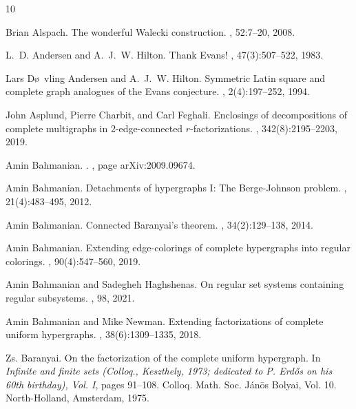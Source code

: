 \documentclass[12pt,oneside]{amsart}
\begin{document}
\begin{itemize}
\end{itemize}


\begin{thebibliography}{10}

Brian Alspach.
\newblock The wonderful {W}alecki construction.
, 52:7--20, 2008.

L.~D. Andersen and A.~J.~W. Hilton.
\newblock Thank {E}vans!
, 47(3):507--522, 1983.

Lars D\o~vling Andersen and A.~J.~W. Hilton.
\newblock Symmetric {L}atin square and complete graph analogues of the {E}vans
  conjecture.
, 2(4):197--252, 1994.

John Asplund, Pierre Charbit, and Carl Feghali.
\newblock Enclosings of decompositions of complete multigraphs in
  2-edge-connected {$r$}-factorizations.
, 342(8):2195--2203, 2019.

Amin {Bahmanian}.
.
, page arXiv:2009.09674.

Amin Bahmanian.
\newblock Detachments of hypergraphs {I}: {T}he {B}erge-{J}ohnson problem.
, 21(4):483--495, 2012.

Amin Bahmanian.
\newblock Connected {B}aranyai's theorem.
, 34(2):129--138, 2014.

Amin Bahmanian.
\newblock Extending edge-colorings of complete hypergraphs into regular
  colorings.
, 90(4):547--560, 2019.

Amin {Bahmanian} and Sadegheh {Haghshenas}.
\newblock On regular set systems containing regular subsystems.
, 98, 2021.

Amin Bahmanian and Mike Newman.
\newblock Extending factorizations of complete uniform hypergraphs.
, 38(6):1309--1335, 2018.

Zs. Baranyai.
\newblock On the factorization of the complete uniform hypergraph.
\newblock In {\em Infinite and finite sets ({C}olloq., {K}eszthely, 1973;
  dedicated to {P}. {E}rd{\H o}s on his 60th birthday), {V}ol. {I}}, pages
  91--108. Colloq. Math. Soc. J\'an\=os Bolyai, Vol. 10. North-Holland,
  Amsterdam, 1975.


\end{thebibliography}
\end{document}
